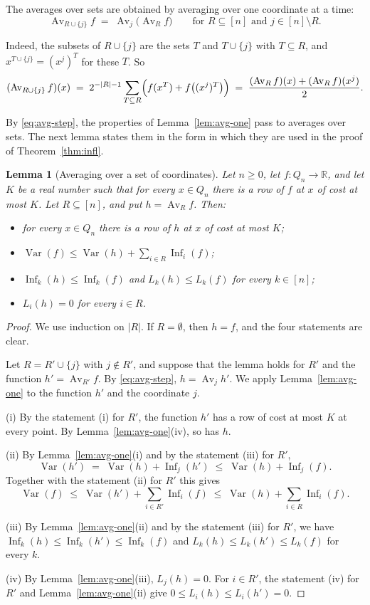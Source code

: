 \documentclass[11pt,reqno]{amsart}
\newtheorem{lemma}[theorem]{Lemma}
\theoremstyle{definition}
\theoremstyle{remark}
\numberwithin{equation}{section}
\theoremstyle{named}
\theoremstyle{plain}
\newcommand{\R}{\mathbb{R}}
\newcommand{\Var}{\operatorname{Var}}
\newcommand{\Inf}{\operatorname{Inf}}
\newcommand{\Av}{\operatorname{Av}}
\newcommand{\abs}[1]{\lvert #1\rvert}
\begin{document}
The averages over sets are obtained by averaging over one coordinate at
a time:
\begin{equation}\label{eq:avg-step}
   \Av_{R\cup\{j\}}f\;=\;\Av_j\bigl(\Av_Rf\bigr)\qquad\text{for }R\subseteq[n]\text{ and }j\in[n]\setminus R .
\end{equation}

Indeed, the subsets of $R\cup\{j\}$ are the sets $T$ and $T\cup\{j\}$ with $T\subseteq R$, and
$x^{T\cup\{j\}}=(x^{j})^{T}$ for these $T$. So
\[
   (\Av_{R\cup\{j\}}f)(x)\;=\;2^{-\abs{R}-1}\sum_{T\subseteq R}\Bigl(f(x^{T})+f\bigl((x^{j})^{T}\bigr)\Bigr)
   \;=\;\frac{(\Av_Rf)(x)+(\Av_Rf)(x^{j})}{2}.
\]

By \eqref{eq:avg-step}, the properties of Lemma~\ref{lem:avg-one} pass to averages over sets. The
next lemma states them in the form in which they are used in the proof of
Theorem~\ref{thm:infl}.

\begin{lemma}[Averaging over a set of coordinates]\label{lem:avg-set}
Let $n\ge0$, let $f\colon Q_n\to\R$, and let $K$ be a real number such that for every $x\in Q_n$
there is a row of $f$ at $x$ of cost at most $K$. Let $R\subseteq[n]$, and put $h=\Av_Rf$. Then:
\begin{itemize}
\item[\textup{(i)}] for every $x\in Q_n$ there is a row of $h$ at $x$ of cost at most $K$;
\item[\textup{(ii)}] $\Var(f)\le\Var(h)+\sum_{i\in R}\Inf_i(f)$;
\item[\textup{(iii)}] $\Inf_k(h)\le\Inf_k(f)$ and $L_k(h)\le L_k(f)$ for every $k\in[n]$;
\item[\textup{(iv)}] $L_i(h)=0$ for every $i\in R$.
\end{itemize}
\end{lemma}

\begin{proof}
We use induction on $\abs{R}$. If $R=\emptyset$, then $h=f$, and the four statements are clear.

Let $R=R'\cup\{j\}$ with $j\notin R'$, and suppose that the lemma holds for $R'$ and the function
$h'=\Av_{R'}f$. By \eqref{eq:avg-step}, $h=\Av_jh'$. We apply Lemma~\ref{lem:avg-one} to the
function $h'$ and the coordinate $j$.

(i) By the statement (i) for $R'$, the function $h'$ has a row of cost at most $K$ at every point.
By Lemma~\ref{lem:avg-one}(iv), so has $h$.

(ii) By Lemma~\ref{lem:avg-one}(i) and by the statement (iii) for $R'$,
\[
   \Var(h')\;=\;\Var(h)+\Inf_j(h')\;\le\;\Var(h)+\Inf_j(f).
\]
Together with the statement (ii) for $R'$ this gives
\[
   \Var(f)\;\le\;\Var(h')+\sum_{i\in R'}\Inf_i(f)\;\le\;\Var(h)+\sum_{i\in R}\Inf_i(f).
\]

(iii) By Lemma~\ref{lem:avg-one}(ii) and by the statement (iii) for $R'$, we have
$\Inf_k(h)\le\Inf_k(h')\le\Inf_k(f)$ and $L_k(h)\le L_k(h')\le L_k(f)$ for every $k$.

(iv) By Lemma~\ref{lem:avg-one}(iii), $L_j(h)=0$. For $i\in R'$, the statement (iv) for $R'$ and
Lemma~\ref{lem:avg-one}(ii) give $0\le L_i(h)\le L_i(h')=0$.
\end{proof}
\end{document}
